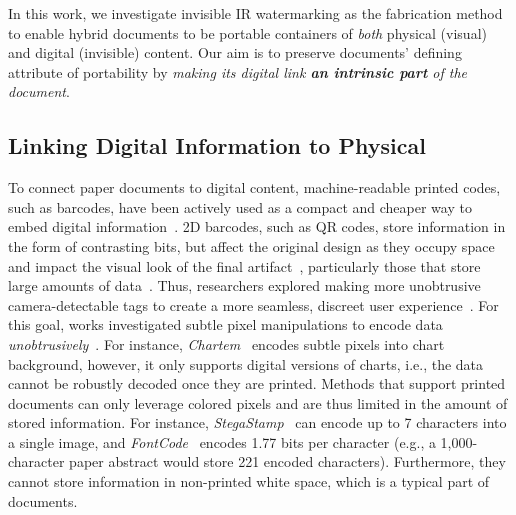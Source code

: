 In this work, we investigate invisible IR watermarking as the fabrication method to enable hybrid documents to be portable containers of \textit{both} physical (visual) and digital (invisible) content. Our aim is to preserve documents' defining attribute of portability by \textit{making its digital link \textbf{an intrinsic part} of the document}.









\subsection{Linking Digital Information to Physical}


To connect paper documents to digital content, machine-readable printed codes, such as barcodes, have been actively used as a compact and cheaper way to embed digital information~\cite{dogan_ubiquitous_2024}. 
2D barcodes, such as QR codes, store information in the form of contrasting bits, but affect the original design as they occupy space and impact the visual look of the final artifact~\cite{getschmann_seedmarkers_2021, song_my_2018}, particularly those that store large amounts of data~\cite{denso_wave_information_2022}. 
Thus, researchers explored making more unobtrusive camera-detectable tags to create a more seamless, discreet user experience~\cite{dogan_g-id_2020, dogan_structcode_2023}.
For this goal, works investigated subtle pixel manipulations to encode data \textit{unobtrusively}~\cite{fu_chartem_2021, xiao_fontcode_2018, tancik_stegastamp_2020, zhang_viscode_2021}.
For instance, \textit{Chartem}~\cite{fu_chartem_2021} encodes subtle pixels into chart background, %
however, it only supports digital versions of charts, i.e., the data cannot be robustly decoded once they are printed.
Methods that support printed documents can only leverage colored pixels and are thus limited in the amount of stored information. %
For instance, \textit{StegaStamp}~\cite{tancik_stegastamp_2020} can encode up to 7 characters into a single image, and \textit{FontCode}~\cite{xiao_fontcode_2018}  encodes 1.77 bits per character (e.g., a 1,000-character paper abstract would store 221 encoded characters).
Furthermore, they cannot store information in non-printed white space, which is a typical part of documents.



